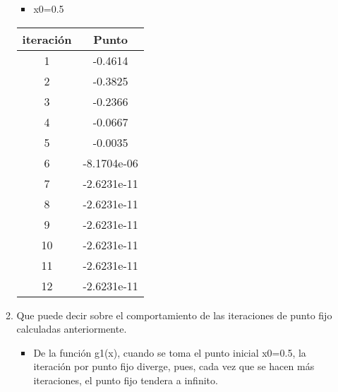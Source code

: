 \documentclass{udparticle}
\begin{document}
\begin{enumerate}
\begin{enumerate}
\begin{table}[H]
\begin{tabular} { |c|c|}
        
        \end{tabular}
        
    \end{table}
     \begin{itemize}
\item x0=0.5
\end{itemize}

\begin{table}[H]
    \centering
        \begin{tabular} { |c|c|}
        
        \hline
        iteración  &  Punto\\
        \hline
        1 &  -0.4614      \\
         \hline
        2 &   -0.3825   \\
         \hline
        3 &  -0.2366 \\
         \hline
        4 &  -0.0667    \\
         \hline
        5 &   -0.0035 \\
         \hline
        6 & -8.1704e-06     \\
         \hline
        7 &     -2.6231e-11 \\
         \hline
        8 &   -2.6231e-11   \\
         \hline
        9 &        -2.6231e-11 \\
         \hline
        10 &     -2.6231e-11    \\
         \hline
        11 &    -2.6231e-11 \\
         \hline
        12 &    -2.6231e-11  \\
        
        
        \end{tabular}
        
    \end{table}
\vspace{3cm}
\item Que puede decir sobre el comportamiento de las iteraciones de punto fijo calculadas anteriormente.
\begin{itemize}

\item De la función g1(x), cuando se toma el punto inicial x0=0.5, la iteración por punto fijo diverge, pues, cada vez que se hacen más iteraciones, el punto fijo tendera a infinito. 
\end{itemize}
\end{enumerate}
\end{enumerate}
\end{document}
